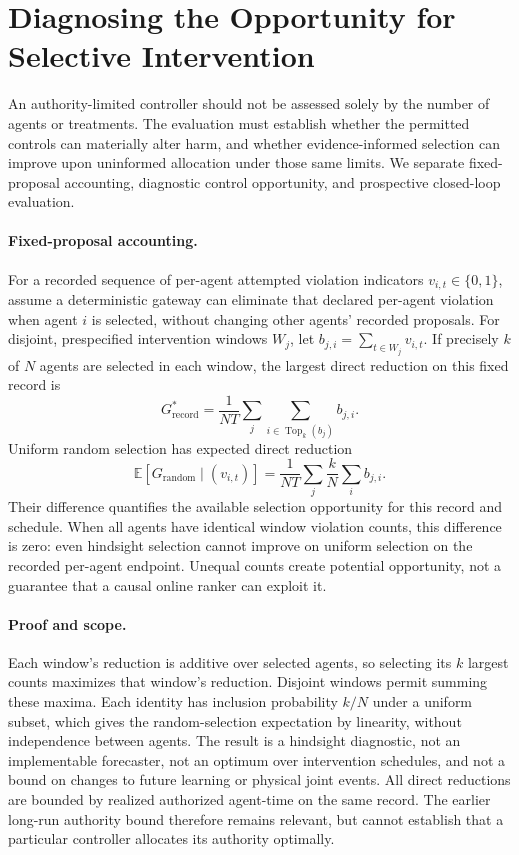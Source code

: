 \section{Diagnosing the Opportunity for Selective Intervention}

An authority-limited controller should not be assessed solely by the number of
agents or treatments. The evaluation must establish whether the permitted controls
can materially alter harm, and whether evidence-informed selection can improve upon
uninformed allocation under those same limits. We separate fixed-proposal
accounting, diagnostic control opportunity, and prospective closed-loop evaluation.

\paragraph{Fixed-proposal accounting.}
For a recorded sequence of per-agent attempted violation indicators
$v_{i,t}\in\{0,1\}$, assume a deterministic gateway can eliminate that declared
per-agent violation when agent $i$ is selected, without changing other agents'
recorded proposals. For disjoint, prespecified intervention windows $W_j$, let
$b_{j,i}=\sum_{t\in W_j}v_{i,t}$. If precisely $k$ of $N$ agents are selected in
each window, the largest direct reduction on this fixed record is
\[
 G^*_{\mathrm{record}}=\frac{1}{NT}\sum_j
          \sum_{i\in\operatorname{Top}_k(b_j)} b_{j,i}.
\]
Uniform random selection has expected direct reduction
\[
 \mathbb E[G_{\mathrm{random}}\mid(v_{i,t})]
 =\frac{1}{NT}\sum_j\frac{k}{N}\sum_i b_{j,i}.
\]
Their difference quantifies the available selection opportunity for this record
and schedule. When all agents have identical window violation counts, this
difference is zero: even hindsight selection cannot improve on uniform selection
on the recorded per-agent endpoint. Unequal counts create potential opportunity,
not a guarantee that a causal online ranker can exploit it.

\paragraph{Proof and scope.}
Each window's reduction is additive over selected agents, so selecting its $k$
largest counts maximizes that window's reduction. Disjoint windows permit summing
these maxima. Each identity has inclusion probability $k/N$ under a uniform subset,
which gives the random-selection expectation by linearity, without independence
between agents. The result is a hindsight diagnostic, not an implementable
forecaster, not an optimum over intervention schedules, and not a bound on changes
to future learning or physical joint events. All direct reductions are bounded by
realized authorized agent-time on the same record. The earlier long-run authority
bound therefore remains relevant, but cannot establish that a particular controller
allocates its authority optimally.

